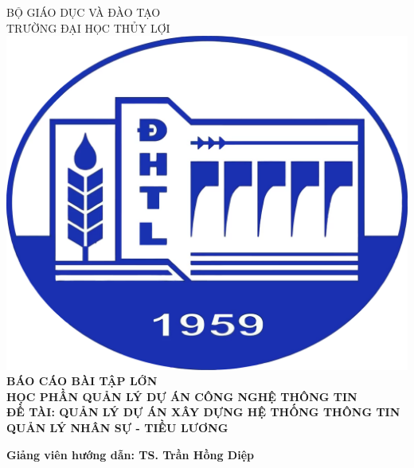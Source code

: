 \begin{titlepage}
    \begin{center}
        {\Large BỘ GIÁO DỤC VÀ ĐÀO TẠO}\\
        {\Large TRƯỜNG ĐẠI HỌC THỦY LỢI}\\[1cm]
    
        \includegraphics[scale=0.15]{images/Logo-DH-Thuy-Loi.png}\\[1.5cm]
    
        {\Large \bfseries BÁO CÁO BÀI TẬP LỚN} \\[1cm] 
        {\Large \bfseries HỌC PHẦN QUẢN LÝ DỰ ÁN CÔNG NGHỆ THÔNG TIN} \\[1cm] 
        {\Large \bfseries ĐỀ TÀI: QUẢN LÝ DỰ ÁN XÂY DỰNG HỆ THỐNG THÔNG TIN QUẢN LÝ NHÂN SỰ - TIỀU LƯƠNG} \\[1cm] 
    
    \end{center}
    
    \vspace{-1.5cm}
    
    \begin{flushleft}
        \textbf{Giảng viên hướng dẫn: TS. Trần Hồng Diệp}
    \end{flushleft}
    

\end{titlepage}
